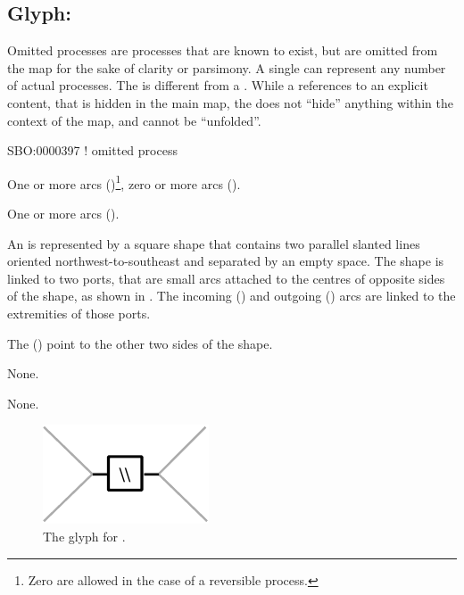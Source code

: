 \subsection{Glyph: }
\label{sec:omitted}

Omitted processes are processes that are known to exist, but are omitted from the map for the sake of clarity or parsimony. A single  can represent any number of actual processes. The  is different from a . While a  references to an explicit content, that is hidden in the main map, the  does not ``hide'' anything within the context of the map, and cannot be ``unfolded''.

\begin{glyphDescription}

\glyphSboTerm
SBO:0000397 ! omitted process


\glyphIncoming
One or more  arcs ()\footnote{Zero  are allowed in the case of a reversible process.}, zero or more  arcs ().



\glyphOutgoing
One or more  arcs ().


\glyphContainer
An  is represented by a square shape that contains two parallel slanted lines oriented northwest-to-southeast and separated by an empty space.
The shape is linked to two ports, that are small arcs attached to the centres of opposite sides of the shape, as shown in .
The incoming  () and outgoing  () arcs are linked to the extremities of those ports.

The  () point to the other two sides of the shape.

\glyphLabel
None.

\glyphAux
None.

\end{glyphDescription}

\begin{figure}[H]
  \centering
  \includegraphics{images/build/omitted.pdf}
  \caption{The \PD glyph for .}
  \label{fig:omitted}
\end{figure}
